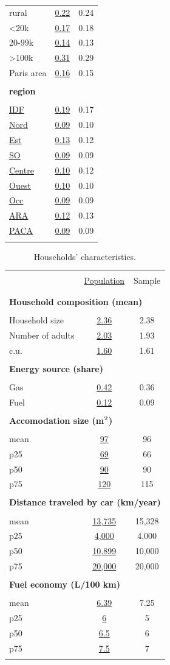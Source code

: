 \documentclass[english,5p,authoryear]{elsarticle}
\begin{document}
\begin{appendices}
\begin{table}[!htbp]
\begin{tabular}{lcc}
rural & \uline{0.22} & 0.24\tabularnewline
<20k & \uline{0.17} & 0.18\tabularnewline
20-99k & \uline{0.14} & 0.13\tabularnewline
>100k & \uline{0.31} & 0.29\tabularnewline
Paris area & \uline{0.16} & 0.15\tabularnewline
\hline  \\[-1.8ex]
\textbf{region} &  & \tabularnewline  \\[-1.8ex]
\uline{IDF} & \uline{0.19} & 0.17\tabularnewline
 \uline{Nord} & \uline{0.09} & 0.10\tabularnewline
 \uline{Est} & \uline{0.13} & 0.12\tabularnewline
\uline{SO} & \uline{0.09} & 0.09\tabularnewline
\uline{Centre} & \uline{0.10} & 0.12\tabularnewline
 \uline{Ouest} & \uline{0.10} & 0.10\tabularnewline
 \uline{Occ} & \uline{0.09} & 0.09\tabularnewline
\uline{ARA} & \uline{0.12} & 0.13\tabularnewline
\uline{PACA} & \uline{0.09} & 0.09\tabularnewline  \\[-1.8ex]
\hline \hline 
\end{tabular}\bigskip{}
\end{table}


\begin{table}[!htbp]
    \caption{Households' characteristics.\label{tab:app-energetic-characs}}
\centering
\begin{tabular}{lcc}
\hline \hline  \\[-1.8ex]
 & \uline{Population} & Sample  \tabularnewline \\[-1.8ex]
\hline  \\[-1.8ex]
\multicolumn{3}{l}{\textbf{Household composition (mean)}} \tabularnewline  \\[-1.8ex]
Household size & \uline{2.36} & 2.38\tabularnewline
Number of adults & \uline{2.03} & 1.93\tabularnewline
c.u. & \uline{1.60} & 1.61\tabularnewline
\hline   \\[-1.8ex]
\multicolumn{3}{l}{\textbf{Energy source (share)}} \tabularnewline  \\[-1.8ex]
Gas & \uline{0.42} & 0.36\tabularnewline
Fuel & \uline{0.12} & 0.09\tabularnewline
\hline   \\[-1.8ex]
\multicolumn{3}{l}{\textbf{Accomodation size (m$^\textnormal{2}$)}} \tabularnewline  \\[-1.8ex]
mean & \uline{97} & 96\tabularnewline
p25 & \uline{69} & 66\tabularnewline
p50 & \uline{90} & 90\tabularnewline
p75 & \uline{120} & 115\tabularnewline
\hline   \\[-1.8ex]
\multicolumn{3}{l}{\textbf{Distance traveled by car (km/year)}} \tabularnewline  \\[-1.8ex]
mean & \uline{13,735} & 15,328\tabularnewline
p25 & \uline{4,000} & 4,000\tabularnewline
p50 & \uline{10,899} & 10,000 \tabularnewline
p75 & \uline{20,000 } & 20,000 \tabularnewline
\hline   \\[-1.8ex]
\multicolumn{3}{l}{\textbf{Fuel economy (L/100 km)}} \tabularnewline  \\[-1.8ex]
mean & \uline{6.39} & 7.25\tabularnewline
p25 & \uline{6} & 5\tabularnewline
p50 & \uline{6.5} & 6\tabularnewline
p75 & \uline{7.5} & 7\tabularnewline  \\[-1.8ex]
\hline \hline 
\end{tabular}\bigskip{}


\end{table}
\end{appendices}
\end{document}
